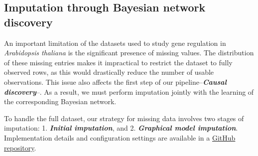 \documentclass[
]{article}
\theoremstyle{definition}
\theoremstyle{remark}
\begin{document}
\subsection{Imputation through Bayesian network
discovery}\label{sec-imputation}

An important limitation of the datasets used to study gene regulation in
\emph{Arabidopsis thaliana} is the significant presence of missing
values. The distribution of these missing entries makes it impractical
to restrict the dataset to fully observed rows, as this would
drastically reduce the number of usable observations. This issue also
affects the first step of our pipeline--\textbf{\emph{Causal
discovery}}--. As a result, we must perform imputation jointly with the
learning of the corresponding Bayesian network.

To handle the full dataset, our strategy for missing data involves two
stages of imputation: 1. \textbf{\emph{Initial imputation}}, and 2.
\textbf{\emph{Graphical model imputation}}. Implementation details and
configuration settings are available in a
\href{https://github.com/cambroise/chloroDAG}{GitHub repository}.
\end{document}
